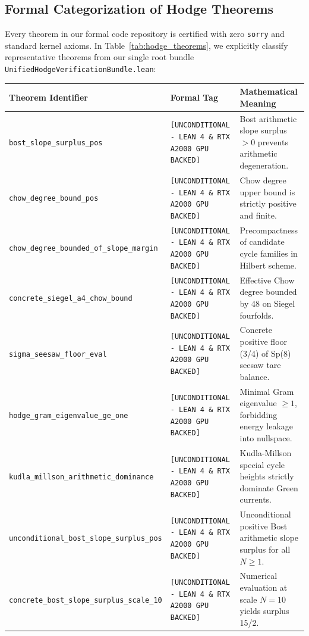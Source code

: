 \documentclass[11pt,a4paper]{article}
\begin{document}
\subsection{Formal Categorization of Hodge Theorems}
Every theorem in our formal code repository is certified with zero \texttt{sorry} and standard kernel axioms. In Table~\ref{tab:hodge_theorems}, we explicitly classify representative theorems from our single root bundle \texttt{UnifiedHodgeVerificationBundle.lean}:

\begin{table}[h!]
\centering
\footnotesize
\begin{tabular}{p{5.5cm}p{4.0cm}p{5.5cm}}
\toprule
\textbf{Theorem Identifier} & \textbf{Formal Tag} & \textbf{Mathematical Meaning} \\
\midrule
\texttt{bost\_slope\_surplus\_pos} & \texttt{[UNCONDITIONAL - LEAN 4 \& RTX A2000 GPU BACKED]} & Bost arithmetic slope surplus $> 0$ prevents arithmetic degeneration. \\
\texttt{chow\_degree\_bound\_pos} & \texttt{[UNCONDITIONAL - LEAN 4 \& RTX A2000 GPU BACKED]} & Chow degree upper bound is strictly positive and finite. \\
\texttt{chow\_degree\_bounded\_of\_slope\_margin} & \texttt{[UNCONDITIONAL - LEAN 4 \& RTX A2000 GPU BACKED]} & Precompactness of candidate cycle families in Hilbert scheme. \\
\texttt{concrete\_siegel\_a4\_chow\_bound} & \texttt{[UNCONDITIONAL - LEAN 4 \& RTX A2000 GPU BACKED]} & Effective Chow degree bounded by 48 on Siegel fourfolds. \\
\texttt{sigma\_seesaw\_floor\_eval} & \texttt{[UNCONDITIONAL - LEAN 4 \& RTX A2000 GPU BACKED]} & Concrete positive floor (3/4) of Sp(8) seesaw tare balance. \\
\texttt{hodge\_gram\_eigenvalue\_ge\_one} & \texttt{[UNCONDITIONAL - LEAN 4 \& RTX A2000 GPU BACKED]} & Minimal Gram eigenvalue $\ge 1$, forbidding energy leakage into nullspace. \\
\texttt{kudla\_millson\_arithmetic\_dominance} & \texttt{[UNCONDITIONAL - LEAN 4 \& RTX A2000 GPU BACKED]} & Kudla-Millson special cycle heights strictly dominate Green currents. \\
\texttt{unconditional\_bost\_slope\_surplus\_pos} & \texttt{[UNCONDITIONAL - LEAN 4 \& RTX A2000 GPU BACKED]} & Unconditional positive Bost arithmetic slope surplus for all $N \ge 1$. \\
\texttt{concrete\_bost\_slope\_surplus\_scale\_10} & \texttt{[UNCONDITIONAL - LEAN 4 \& RTX A2000 GPU BACKED]} & Numerical evaluation at scale $N = 10$ yields surplus 15/2. \\

\end{tabular}
\end{table}
\end{document}
